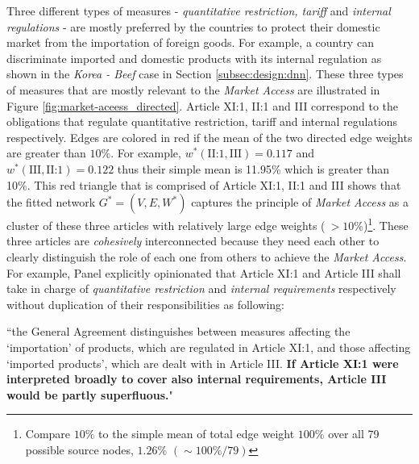  Three different types of measures - \textit{quantitative restriction, tariff} and \textit{internal regulations} - are mostly preferred by the countries to protect their domestic market from the importation of foreign goods. For example, a country can
 discriminate imported and domestic products with its internal regulation as shown in the \textit{Korea - Beef} case in Section \ref{subsec:design:dnn}.
 These three types of measures that are mostly relevant to the \textit{Market Access} are illustrated in Figure \ref{fig:market-aceess_directed}.
 Article XI:1, II:1 and III correspond to the obligations that regulate quantitative restriction, tariff and internal regulations respectively.
 Edges are colored in red if the mean of the two directed edge weights are greater than $10\%$. For example, $w^*(\text{II:1}, \text{III}) = 0.117$ and $w^*(\text{III}, \text{II:1}) = 0.122$ thus their simple mean is 11.95\% which is greater than 10\%.
 This red triangle that is comprised of Article XI:1, II:1 and III shows that the fitted network $G^* = (V, E, W^*)$ captures the principle of \textit{Market Access} as a cluster of these three articles with relatively large edge weights ($\: >10\%$)\footnote{Compare $10\%$ to the simple mean of total edge weight $100\%$ over all 79 possible source nodes, $1.26\%$ $(\sim 100\% / 79)$}.
 These three articles are \textit{cohesively} interconnected because they need each other to clearly distinguish the role of each one from others to achieve the \textit{Market Access}.
 For example, Panel explicitly opinionated that Article XI:1 and Article III shall take in charge of \textit{quantitative restriction} and \textit{internal requirements} respectively without duplication of their responsibilities as following:
  
 \begin{displayquote}[][]
 ``the General Agreement distinguishes between measures affecting the `importation' of products,
 which are regulated in Article XI:1, and those affecting `imported products', which are dealt with in
 Article III. \textbf{If Article XI:1 were interpreted broadly to cover also internal requirements, Article III
 would be partly superfluous.}"
 \end{displayquote}
  
